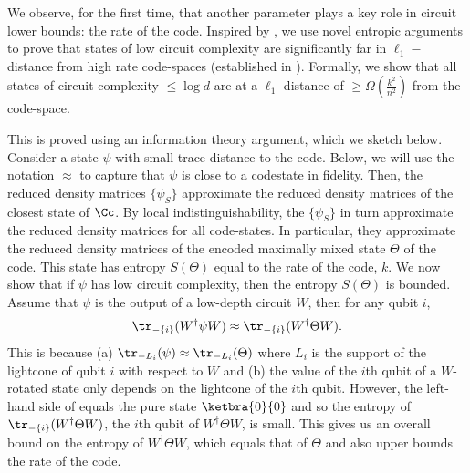 \documentclass{toc}
\begin{document}
We observe, for the first time, that another parameter plays a key role in circuit lower bounds: the rate of the code. Inspired by \cite{PhysRevLett.104.050503}, we use novel entropic arguments to prove that states of low circuit complexity are significantly far in $\ell_1-$distance from high rate code-spaces (established in ). Formally, we show that all states of circuit complexity $\leq \log d$ are at a $\ell_1$-distance of $\geq \Omega(\frac{k^2}{n^2})$ from the code-space.

This is proved using an information theory argument, 
%
which we sketch below. Consider a state $\psi$ with small trace distance to the code.
%
Below, we will use
the notation  %
$\approx$ to capture %
%
that $\psi$ is close to a codestate in fidelity.
%
Then, the reduced density matrices $\{\psi_S\}$ approximate the reduced density matrices of the closest state of $\Cc$. By local indistinguishability, the $\{\psi_S\}$ in turn approximate the reduced density matrices for all code-states. In particular, they approximate the reduced density matrices of the encoded
%
maximally mixed   %
state $\Theta$ of the code. This state has entropy $S(\Theta)$ equal to the rate of the code, $k$. We now show that if $\psi$ has low circuit complexity, then the entropy $S(\Theta)$ is bounded. 
Assume that $\psi$ is the output of a low-depth circuit %
%
%
$W$, then for any qubit $i$,
%
%
\begin{align}
    \tr_{-\{i\}}(W^\dagger \psi W) \approx \tr_{-\{i\}}(W^\dagger \Theta W). \label{eq:approxidea}
\end{align}
This is because (a) $\tr_{-L_i}(\psi) \approx \tr_{-L_i}(\Theta)$ where $L_i$ is the support of the lightcone of qubit $i$ with respect to $W$ and (b) the value of the $i$th qubit of a $W$-rotated state only depends on the lightcone of the $i$th qubit. However, the left-hand side of  equals the pure state $\ketbra{0}{0}$ and so the entropy of $\tr_{-\{i\}}(W^\dagger \Theta W)$, the $i$th qubit of $W^\dagger \Theta W$, is small. This gives us an overall bound on the entropy of $W^\dagger\Theta W$, which equals that of $\Theta$ and also upper bounds the rate of the code.
\end{document}
